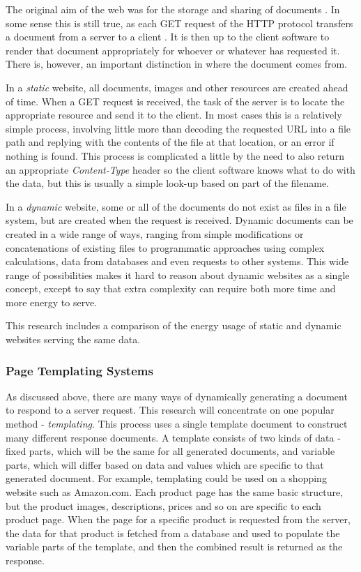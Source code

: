 The original aim of the web was for the storage and sharing of documents \citep{Berners-Lee1992}. In some sense this is still true, as each GET request of the HTTP protocol transfers a document from a server to a client \citep{Berners-Lee1996} \citep{rfc2616}. It is then up to the client software to render that document appropriately for whoever or whatever has requested it. There is, however, an important distinction in where the document comes from.

In a \emph{static} website, all documents, images and other resources are created ahead of time. When a GET request is received, the task of the server is to locate the appropriate resource and send it to the client. In most cases this is a relatively simple process, involving little more than decoding the requested URL into a file path and replying with the contents of the file at that location, or an error if nothing is found. This process is complicated a little by the need to also return an appropriate \emph{Content-Type} header so the client software knows what to do with the data, but this is usually a simple look-up based on part of the filename.

In a \emph{dynamic} website, some or all of the documents do not exist as files in a file system, but are created when the request is received. Dynamic documents can be created in a wide range of ways, ranging from simple modifications or concatenations of existing files to programmatic approaches using complex calculations, data from databases and even requests to other systems. This wide range of possibilities makes it hard to reason about dynamic websites as a single concept, except to say that extra complexity can require both more time and more energy to serve.

This research includes a comparison of the energy usage of static and dynamic websites serving the same data.

\subsubsection{Page Templating Systems}

As discussed above, there are many ways of dynamically generating a document to respond to a server request. This research will concentrate on one popular method - \emph{templating}. This process uses a single template document to construct many different response documents. A template consists of two kinds of data - fixed parts, which will be the same for all generated documents, and variable parts, which will differ based on data and values which are specific to that generated document. For example, templating could be used on a shopping website such as Amazon.com. Each product page has the same basic structure, but the product images, descriptions, prices and so on are specific to each product page. When the page for a specific product is requested from the server, the data for that product is fetched from a database and used to populate the variable parts of the template, and then the combined result is returned as the response.

